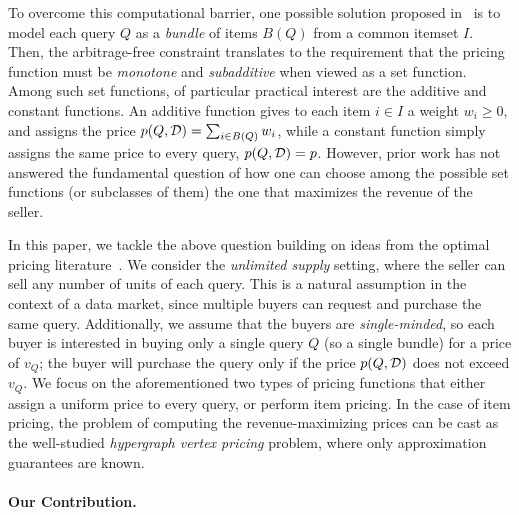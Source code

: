 To overcome this computational barrier, one possible solution proposed in~\cite{deep2017qirana}  is to model each query $Q$ as a {\em bundle} of items $B(Q)$ from a common itemset $I$. Then, the arbitrage-free constraint translates to the requirement that the pricing function must be {\em monotone} and {\em subadditive} when viewed as a set function. Among such set functions, of particular practical interest are the additive and constant functions. An additive function gives to each item $i \in I$  a weight $w_i \geq 0$, and assigns the price $p(Q,\mathcal{D}) = \sum_{i \in B(Q)} w_i$, while a constant function simply assigns the same  price to every query, \ie $p(Q,\mathcal{D}) = p$.
However, prior work has not answered the fundamental question of how one can choose among the possible set functions (or subclasses of them) the one that maximizes the revenue of the seller. 

In this paper, we tackle the above question building on ideas from the optimal pricing 
literature~\cite{guruswami2005profit}. We consider the {\em unlimited supply} setting, where the 
seller can sell any number of units of each query. This is a natural assumption in the context of a data market,
since multiple buyers can request and purchase the same query.
Additionally, we assume that the buyers are {\em single-minded}, so each
buyer is interested in buying only a single query $Q$ (so a single bundle) for a price of $v_Q$; the buyer will
purchase the query only if the price $p(Q, \mathcal{D})$ does not exceed $v_Q$. We focus on the aforementioned two
types of pricing functions that either assign a uniform price to every query, or perform item pricing. 
In the case of item pricing, the problem of computing the revenue-maximizing prices can be cast as
the well-studied {\em hypergraph vertex pricing} problem, where only approximation guarantees are known.



\paragraph{Our Contribution.}







